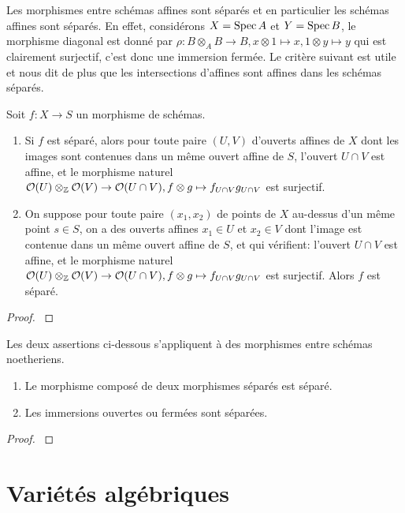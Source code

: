 Les morphismes entre schémas affines sont séparés et en particulier les schémas affines sont séparés. En effet, considérons $X=\operatorname{Spec} A$ et $Y=\operatorname{Spec} B$, le morphisme diagonal est donné par $\rho: B\otimes_A B\rightarrow B, x\otimes 1\mapsto x, 1\otimes y \mapsto y$ qui est clairement surjectif, c'est donc une immersion fermée. Le critère suivant est utile et nous dit de plus que les intersections d'affines sont affines dans les schémas séparés.

\begin{prop}\label{sepCritere}
Soit $f:X\rightarrow S$ un morphisme de schémas.
	\begin{enumerate}
	\item Si $f$ est séparé, alors pour toute paire $(U,V)$ d'ouverts affines de $X$ dont les images sont contenues dans un même ouvert affine de $S$, l'ouvert $U\cap V$ est affine, et le morphisme naturel $\mathcal{O}(U)\otimes_{\mathbb{Z}} \mathcal{O}(V)\rightarrow\mathcal{O}(U\cap V), f\otimes g\mapsto f_{U\cap V}g_{U\cap V}$ est surjectif.
	\item On suppose pour toute paire $(x_1,x_2)$ de points de $X$ au-dessus d'un même point $s\in S$, on a des ouverts affines $x_1\in U$ et $x_2\in V$ dont l'image est contenue dans un même ouvert affine de $S$, et qui vérifient: l'ouvert $U\cap V$ est affine, et le morphisme naturel $\mathcal{O}(U)\otimes_{\mathbb{Z}} \mathcal{O}(V)\rightarrow\mathcal{O}(U\cap V), f\otimes g\mapsto f_{U\cap V}g_{U\cap V}$ est surjectif. Alors $f$ est séparé.
	\end{enumerate}
\end{prop}
\begin{proof}
\cite[\href{http://stacks.math.columbia.edu/tag/01KP}{Lemma 01KP}]{stacks-project}
\end{proof}

\begin{prop}\label{sepCritere2}
Les deux assertions ci-dessous s'appliquent à des morphismes entre schémas noetheriens.
\begin{enumerate}
	\item Le morphisme composé de deux morphismes séparés est séparé.
	\item Les immersions ouvertes ou fermées sont séparées.
	\end{enumerate}
\end{prop}
\begin{proof}
\cite[II.4.6]{Hartshorne} 
\end{proof}

\section{Variétés algébriques}


